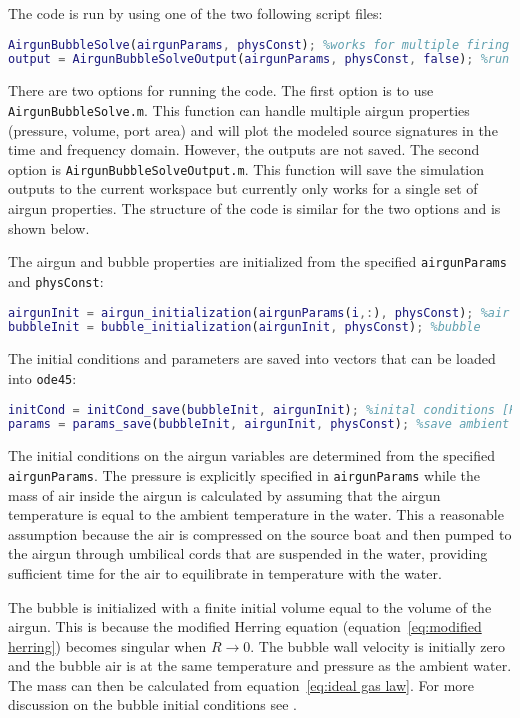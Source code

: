 \documentclass[10pt]{article}
\begin{document}
The code is run by using one of the two following script files:
\begin{lstlisting}[language=Matlab]
AirgunBubbleSolve(airgunParams, physConst); %works for multiple firing configurations
output = AirgunBubbleSolveOutput(airgunParams, physConst, false); %run solver and saves outputs (only works for a single firing configuration). True or false flag determines if solution is plotted or not.
\end{lstlisting}
There are two options for running the code. The first option is to use \texttt{AirgunBubbleSolve.m}. This function can handle multiple airgun properties (pressure, volume, port area) and will plot the modeled source signatures in the time and frequency domain. However, the outputs are not saved. The second option is \texttt{AirgunBubbleSolveOutput.m}. This function will save the simulation outputs to the current workspace but currently only works for a single set of airgun properties. The structure of the code is similar for the two options and is shown below.

The airgun and bubble properties are initialized from the specified \texttt{airgunParams} and \texttt{physConst}:
\begin{lstlisting}[language=Matlab]
airgunInit = airgun_initialization(airgunParams(i,:), physConst); %air gun
bubbleInit = bubble_initialization(airgunInit, physConst); %bubble
\end{lstlisting}

The initial conditions and parameters are saved into vectors that can be loaded into \texttt{ode45}:
\begin{lstlisting}[language=Matlab]
initCond = initCond_save(bubbleInit, airgunInit); %inital conditions [R,U,mb,Tb,pa,ma]
params = params_save(bubbleInit, airgunInit, physConst); %save ambient water, airgun and bubble parameters into vector 
\end{lstlisting}
The initial conditions on the airgun variables are determined from the specified \texttt{airgunParams}. The pressure is explicitly specified in \texttt{airgunParams} while the mass of air inside the airgun is calculated by assuming that the airgun temperature is equal to the ambient temperature in the water. This a reasonable assumption because the air is compressed on the source boat and then pumped to the airgun through umbilical cords that are suspended in the water, providing sufficient time for the air to equilibrate in temperature with the water.

The bubble is initialized with a finite initial volume equal to the volume of the airgun. This is because the modified Herring equation (equation~\ref{eq:modified herring}) becomes singular when $R\rightarrow0$. The bubble wall velocity is initially zero and the bubble air is at the same temperature and pressure as the ambient water. The mass can then be calculated from equation~\ref{eq:ideal gas law}. For more discussion on the bubble initial conditions see \citet{Watson2019_airgun}.
\end{document}
